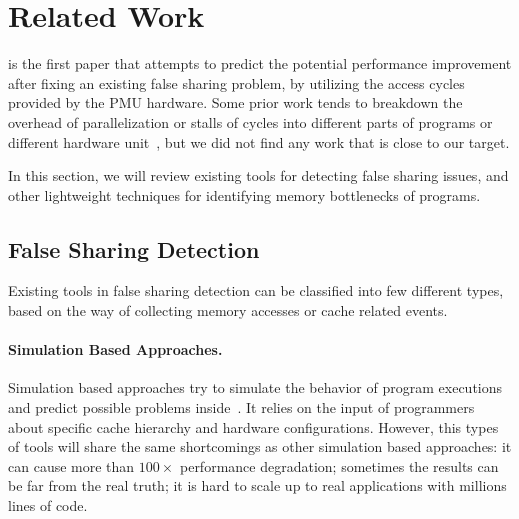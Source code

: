 \section{Related Work}

\label{sec:relatedwork}
\cheetah{} is the first paper that attempts to predict the potential performance improvement after fixing an existing false sharing problem, by utilizing the access cycles provided by the PMU hardware.  Some prior work tends to breakdown the overhead of parallelization or stalls of cycles into different parts of programs or different hardware unit~\cite{Crovella:1994:PPP:602770.602870, Azimi:2005:OPA:1088149.1088163}, but we did not find any work that is close to our target. 

In this section, we will review existing tools for detecting false sharing issues, and other lightweight techniques for identifying memory bottlenecks of programs.

\subsection{False Sharing Detection}

Existing tools in false sharing detection can be classified into few different types, based on the way of collecting memory accesses or cache related events. 

\paragraph{Simulation Based Approaches.} Simulation based approaches try to simulate the behavior of program executions and predict possible problems inside~\cite{falseshare:simulator}. It relies on the input of programmers about specific cache hierarchy and hardware configurations. However, this types of tools will share the same shortcomings as other simulation based approaches: it can cause more than $100\times$ performance degradation; sometimes the results can be far from the real truth; it is hard to scale up to real applications with millions lines of code. 


